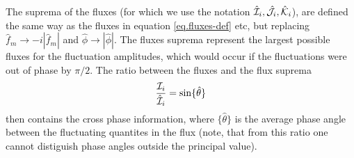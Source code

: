 The suprema of the fluxes (for which we use the notation ${\hat {\cal I}_i}, {\hat {\cal J}_i}, {\hat {\cal K}_i}$), 
are defined the same way as the fluxes in equation \ref{eq.fluxes-def} etc, 
but replacing $\hat f_m \rightarrow -i |\hat f_m|$ and $\hat \phi \rightarrow |\hat \phi|$.  The fluxes suprema represent 
the largest possible fluxes for the fluctuation amplitudes, which would occur if the fluctuations were out of phase by $\pi/2$.
The ratio between the fluxes and the flux suprema
\begin{equation}
\frac{{\cal I}_i}{\hat {\cal I}_i} = \sin \{ \hat \theta \}
\end{equation}
then contains the cross phase information, where $\{ \hat \theta \}$ is the average phase angle between the fluctuating quantites in the flux (note, 
that from this ratio one cannot distiguish phase angles outside the principal value).


